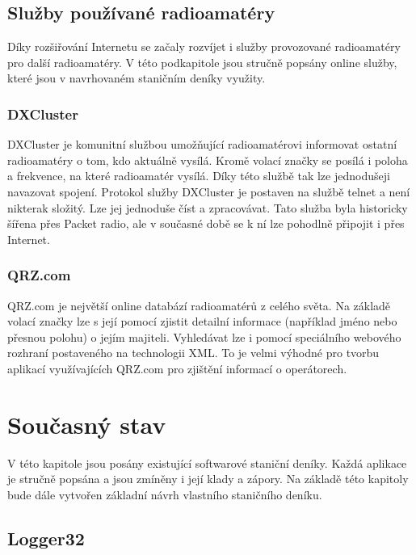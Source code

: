 \section{Služby používané radioamatéry}
\label{radioamateri_sluzby}

Díky rozšiřování Internetu se začaly rozvíjet i služby provozované radioamatéry pro další radioamatéry. V této podkapitole
jsou stručně popsány online služby, které jsou v navrhovaném staničním deníky využity.

\subsection{DXCluster}

DXCluster je komunitní službou umožňující radioamatérovi informovat ostatní
radioamatéry o tom, kdo aktuálně vysílá. Kromě
volací značky se posílá i poloha a frekvence, na které radioamatér vysílá. Díky této službě tak lze jednodušeji navazovat
spojení. Protokol služby DXCluster je postaven na službě telnet a není nikterak
složitý. Lze jej jednoduše číst a zpracovávat. Tato služba byla historicky
šířena přes Packet radio, ale v současné době se k ní lze pohodlně připojit i přes
Internet.

\subsection{QRZ.com}

QRZ.com je největší online databází radioamatérů z celého světa. Na základě volací značky lze s její pomocí zjistit detailní
informace (například jméno nebo přesnou polohu) o jejím majiteli. Vyhledávat lze i pomocí speciálního webového rozhraní
postaveného na technologii XML. To je velmi výhodné pro tvorbu aplikací využívajících QRZ.com pro zjištění informací o
operátorech.

\chapter{Současný stav}
\label{soucasnost}

V této kapitole jsou posány existující softwarové staniční deníky. Každá aplikace je stručně
popsána a jsou zmíněny i její klady a zápory. Na základě této kapitoly bude dále
vytvořen základní návrh vlastního staničního deníku.

\section{Logger32}%

